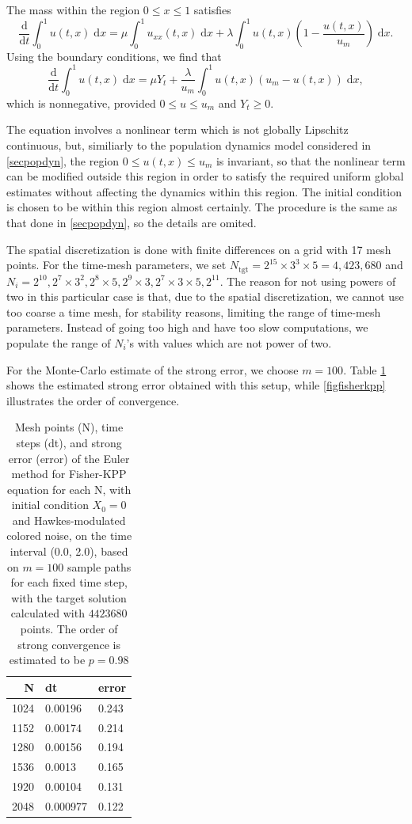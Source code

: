 \documentclass[reqno,12pt]{amsart}
\theoremstyle{plain} %
\theoremstyle{definition} %
\begin{document}
The mass within the region $0\leq x \leq 1$ satisfies
\[
   \frac{\mathrm{d}}{\mathrm{d} t} \int_0^1 u(t, x) \;\mathrm{d}x = \mu\int_0^1 u_{xx}(t, x) \;\mathrm{d}x + \lambda \int_0^1 u(t, x)\left(1 - \frac{u(t, x)}{u_m}\right)\;\mathrm{d}x.
\]
Using the boundary conditions, we find that
\[
   \frac{\mathrm{d}}{\mathrm{d}t} \int_0^1 u(t, x) \;\mathrm{d}x = \mu Y_t  + \frac{\lambda}{u_m} \int_0^1 u(t, x)\left(u_m - u(t, x)\right)\;\mathrm{d}x,
\]
which is nonnegative, provided $0 \leq u \leq u_m$ and $Y_t \geq 0$.

The equation involves a nonlinear term which is not globally Lipschitz continuous, but, similiarly to the population dynamics model considered in \cref{secpopdyn}, the region $0 \leq u(t, x) \leq u_m$ is invariant, so that the nonlinear term can be modified outside this region in order to satisfy the required uniform global estimates without affecting the dynamics within this region. The initial condition is chosen to be within this region almost certainly. The procedure is the same as that done in \cref{secpopdyn}, so the details are omited.

The spatial discretization is done with finite differences on a grid with 17 mesh points. For the time-mesh parameters, we set $N_{\textrm{tgt}} = 2^{15} \times 3^3 \times 5 = 4,423,680$ and $N_i = 2^{10}, 2^7 \times 3^2, 2^8 \times 5, 2^9 \times 3, 2^7 \times 3 \times 5, 2^{11}$. The reason for not using powers of two in this particular case is that, due to the spatial discretization, we cannot use too coarse a time mesh, for stability reasons, limiting the range of time-mesh parameters. Instead of going too high and have too slow computations, we populate the range of $N_i$'s with values which are not power of two.

For the Monte-Carlo estimate of the strong error, we choose $m=100.$ Table \ref{tablefisherkpp} shows the estimated strong error obtained with this setup, while \cref{figfisherkpp} illustrates the order of convergence.

\begin{table}
    \begin{tabular}[htb]{|r|l|l|}
        \hline N & dt & error\\
        \hline \hline
        1024 & 0.00196 & 0.243 \\
        1152 & 0.00174 & 0.214 \\
        1280 & 0.00156 & 0.194 \\
        1536 & 0.0013 & 0.165 \\
        1920 & 0.00104 & 0.131 \\
        2048 & 0.000977 & 0.122 \\
        \hline
    \end{tabular}
    \bigskip

    \caption{Mesh points (N), time steps (dt), and strong error (error) of the Euler method for Fisher-KPP equation for each N, with initial condition $X_0 = 0$ and Hawkes-modulated colored noise, on the time interval (0.0, 2.0), based on $m = 100$ sample paths for each fixed time step, with the target solution calculated with $4423680$ points. The order of strong convergence is estimated to be $p = 0.98$}
    \label{tablefisherkpp}
\end{table}
\end{document}
